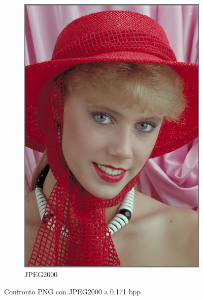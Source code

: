 \begin{figure}[h!]
\begin{subfigure}[]{0.3\textwidth}
        \includegraphics[width=\textwidth]{Immagini/IMAGES/JPEG2000_2_IMG0004.pdf}
        \caption{JPEG2000}
        \label{fig:CompressedJPEG2000}
    \end{subfigure}
    \caption{Confronto PNG con JPEG2000 a 0.171 bpp}
    \label{fig:CompressionJPEG2000}
\end{figure}


